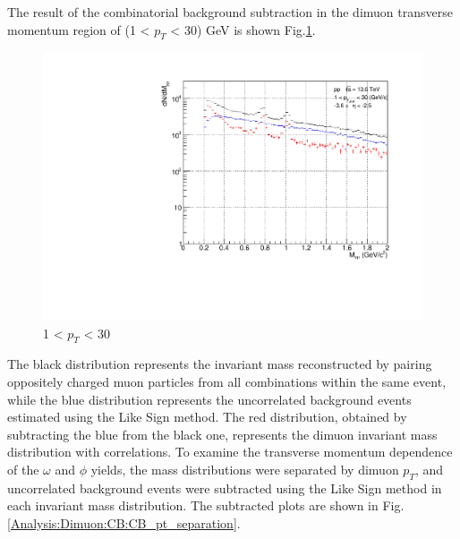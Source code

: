                 The result of the combinatorial background subtraction in the dimuon transverse momentum region of (1 < $p_T$ < 30) GeV is shown Fig.\ref{All_pt_CB}.\@
                \begin{figure}[H]
                    \centering
                    \includegraphics[keepaspectratio, scale=0.5]{fig/3_4_1_CB_pt_1to30.pdf}
                    \caption{1 < $p_{T}$ < 30}
                    \label{All_pt_CB}
                \end{figure}
                The black distribution represents the invariant mass reconstructed by pairing oppositely charged muon particles from all combinations within the same event, while the blue distribution represents the uncorrelated background events estimated using the Like Sign method. The red distribution, obtained by subtracting the blue from the black one, represents the dimuon invariant mass distribution with correlations.
                To examine the transverse momentum dependence of the $\omega$ and $\phi$ yields, the mass distributions were separated by dimuon $p_T$, and uncorrelated background events were subtracted using the Like Sign method in each invariant mass distribution. The subtracted plots are shown in Fig.\ref{Analysis:Dimuon:CB:CB_pt_separation}.\@

